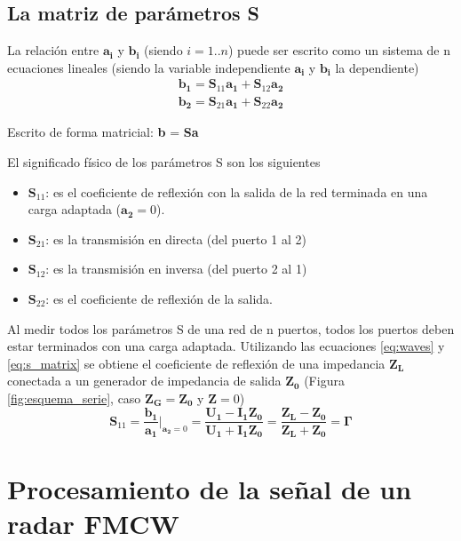 \subsection{La matriz de parámetros S}

La relación entre $\bm{a_i}$ y $\bm{b_i}$ (siendo $i=1..n$) puede ser escrito como un sistema de n ecuaciones lineales (siendo la variable independiente $\bm{a_i}$ y $\bm{b_i}$ la dependiente)
\begin{equation}
\begin{aligned}
  \bm{b_1} = \bm{S}_{11}\bm{a_1} + \bm{S}_{12}\bm{a_2} \\
  \bm{b_2} = \bm{S}_{21}\bm{a_1} + \bm{S}_{22}\bm{a_2}
\end{aligned}
\label{eq:s_matrix}
\end{equation}

Escrito de forma matricial: \textbf{b} = \textbf{Sa}

El significado físico de los parámetros S son los siguientes
\begin{itemize}
  \item $\bm{S}_{11}$: es el coeficiente de reflexión con la salida de la red terminada en una carga adaptada ($\bm{a_2} = 0$).
  \item $\bm{S}_{21}$: es la transmisión en directa (del puerto 1 al 2)
  \item $\bm{S}_{12}$: es la transmisión en inversa (del puerto 2 al 1)
  \item $\bm{S}_{22}$: es el coeficiente de reflexión de la salida.
\end{itemize}

Al medir todos los parámetros S de una red de n puertos, todos los puertos deben estar terminados con una carga adaptada. Utilizando las ecuaciones \ref{eq:waves} y \ref{eq:s_matrix} se obtiene el coeficiente de reflexión de una impedancia $\bm{Z_L}$ conectada a un generador de impedancia de salida $\bm{Z_0}$ (Figura \ref{fig:esquema_serie}, caso $\bm{Z_G} = \bm{Z_0}$ y $\bm{Z} = 0$)
\begin{equation}
\bm{S}_{11} = \dfrac{\bm{b_1}}{\bm{a_1}}\bigg|_{\bm{a_2}=0} = \dfrac{\bm{U_1} - \bm{I_1}\bm{Z_0}}{\bm{U_1} + \bm{I_1}\bm{Z_0}} = \dfrac{\bm{Z_L} - \bm{Z_0}}{\bm{Z_L} + \bm{Z_0}} = \bm{\Gamma}
\end{equation}


\section{Procesamiento de la señal de un radar FMCW}

